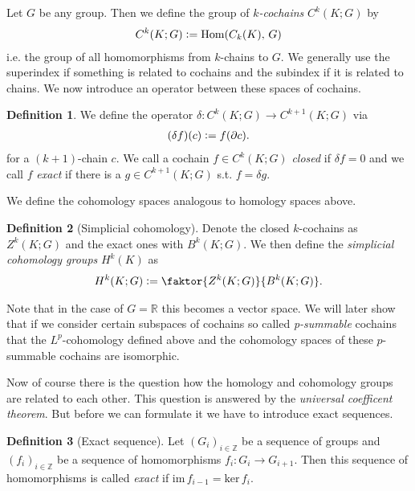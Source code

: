 \documentclass[12pt,a4paper]{article}
\theoremstyle{definition}
\newtheorem{definition}{Definition}
\newcommand{\integers}{\mathbb{Z}}
\newcommand{\real}{\mathbb{R}}
\begin{document}
Let $G$ be any group. Then we define the group 
of \textit{$k$-cochains} $C^k(K;G)$ by
\begin{align*}
    C^k(K;G) \vcentcolon= \text{Hom}(C_k(K),\,G)
\end{align*}
i.e. the group of all homomorphisms from $k$-chains to $G$. 
We generally use the superindex if something is related to 
cochains and the subindex if it is related to chains. 
We now introduce an operator between these spaces of cochains.
\begin{definition}
    We define the operator $\delta: C^k(K;G) \rightarrow C^{k+1}(K;G)$ via
    \begin{align*}
        (\delta f) (c) \vcentcolon= f(\partial c).
    \end{align*}
    for a $(k+1)$-chain $c$.
    We call a cochain $f \in C^k(K;G)$ \textit{closed} if $\delta f = 0$ 
    and we call $f$
    \textit{exact} if there is a $g \in C^{k+1}(K;G)$ s.t. $f = \delta g$.
\end{definition}
\noindent We define the cohomology spaces analogous to homology spaces above.
\begin{definition}[Simplicial cohomology]
    Denote the closed $k$-cochains as $Z^k(K;G)$ and the 
    exact ones with $B^k(K;G)$. 
    We then define the \textit{simplicial cohomology groups}
    $H^k(K)$ as
    \begin{align*}
        H^k(K;G) \vcentcolon= \faktor{Z^k(K;G)}{B^k(K;G)}.
    \end{align*}
\end{definition}
Note that in the case of $G = \real$ this becomes a vector space.
We will later show that if we consider certain subspaces of cochains so called
\textit{p-summable} cochains that the $L^p$-cohomology defined above and the
cohomology spaces of these $p$-summable cochains are isomorphic.


Now of course there is the question how the homology and cohomology groups 
are related to each other. This question is answered by the
\textit{universal coefficent theorem}. But before we can formulate it we have 
to introduce exact sequences.
\begin{definition}[Exact sequence]
    Let $(G_i)_{i\in \integers}$ be a sequence of groups and 
    $(f_i)_{i \in \integers}$ be a sequence of homomorphisms
    $f_i: G_i \rightarrow G_{i+1}$. Then this sequence of homomorphisms is
    called \textit{exact} if $\text{im}\,f_{i-1} = \text{ker}\,f_i$.
\end{definition}
\end{document}
